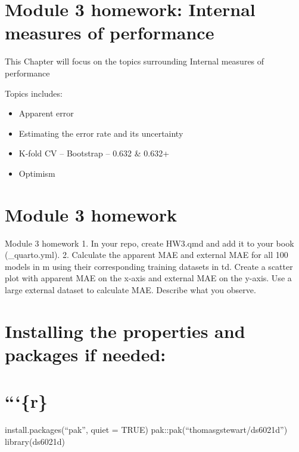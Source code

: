 \documentclass[
  letterpaper,
  DIV=11,
  numbers=noendperiod]{scrreprt}
\providecommand{\tightlist}{%
  \setlength{\itemsep}{0pt}\setlength{\parskip}{0pt}}
\begin{document}

\chapter{Module 3 homework: Internal measures of
performance}\label{module-3-homework-internal-measures-of-performance}

This Chapter will focus on the topics surrounding Internal measures of
performance

Topics includes:

\begin{itemize}
\tightlist
\item
  Apparent error
\item
  Estimating the error rate and its uncertainty
\item
  K-fold CV -- Bootstrap -- 0.632 \& 0.632+
\item
  Optimism
\end{itemize}


\chapter{Module 3 homework}\label{module-3-homework}

Module 3 homework 1. In your repo, create HW3.qmd and add it to your
book (\_quarto.yml). 2. Calculate the apparent MAE and external MAE for
all 100 models in m using their corresponding training datasets in td.
Create a scatter plot with apparent MAE on the x-axis and external MAE
on the y-axis. Use a large external dataset to calculate MAE. Describe
what you observe.


\chapter{Installing the properties and packages if
needed:}\label{installing-the-properties-and-packages-if-needed-1}


\chapter{```\{r\}}\label{r-2}

install.packages(``pak'', quiet = TRUE)
pak::pak(``thomasgstewart/ds6021d'') library(ds6021d)

\end{document}
